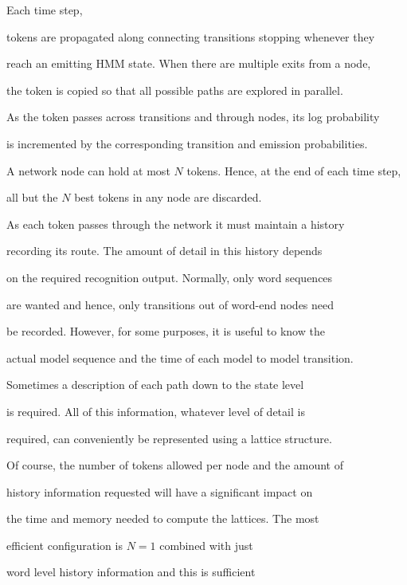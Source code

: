 Each time step,


tokens are propagated along connecting transitions stopping whenever they


reach an emitting HMM state.  When there are multiple exits from a node,


the token is copied so that all possible paths are explored in parallel.


As the token passes across transitions and through nodes, its log probability


is incremented by the corresponding transition and emission probabilities.


A network node can hold at most $N$ tokens.  Hence, at the end of each time step,


all but the $N$ best tokens in any node are discarded.








As each token passes through the network it must maintain a history


recording its route.  The amount of detail in this history depends


on the required recognition output.  Normally, only word sequences


are wanted and hence, only transitions out of word-end nodes need


be recorded.  However, for some purposes, it is useful to know the


actual model sequence and the time of each model to model transition.


Sometimes a description of each path down to the state level


is required.  All of this information, whatever level of detail is


required, can conveniently be represented using a lattice structure.





Of course, the number of tokens allowed per node and the amount of


history information requested will have a significant impact on


the time and memory needed to compute the lattices.  The most


efficient configuration is $N=1$ combined with just 


word level history information and this is sufficient


